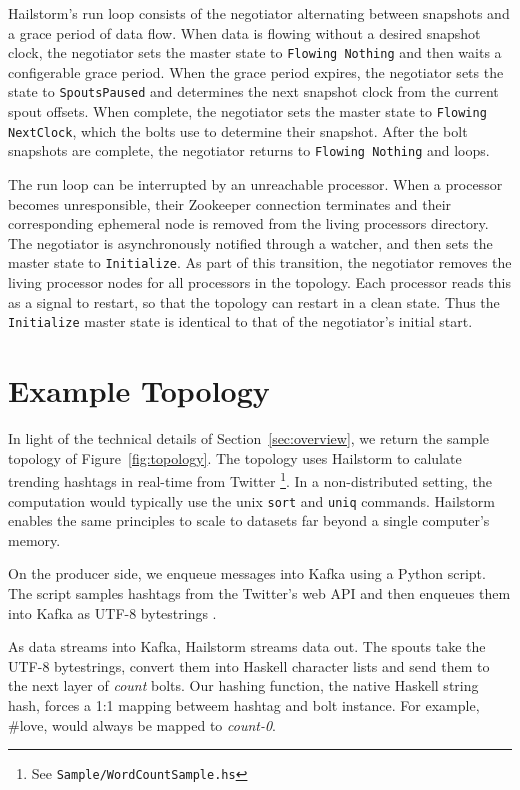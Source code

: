 \documentclass[10pt,nocopyrightspace]{sigplanconf}
\begin{document}
Hailstorm's run loop consists of the negotiator alternating between snapshots
and a grace period of data flow. When data is flowing without a desired snapshot
clock, the negotiator sets the master state to \lstinline{Flowing Nothing} and
then waits a configerable grace period. When the grace period expires, the
negotiator sets the state to \lstinline{SpoutsPaused} and determines the next
snapshot clock from the current spout offsets. When complete, the negotiator sets
the master state to \lstinline{Flowing NextClock}, which the bolts use to determine
their snapshot. After the bolt snapshots are complete, the negotiator returns to
\lstinline{Flowing Nothing} and loops.

The run loop can be interrupted by an unreachable processor. When a processor
becomes unresponsible, their Zookeeper connection terminates and their
corresponding ephemeral node is removed from the living processors directory.
The negotiator is asynchronously notified through a watcher, and then sets the
master state to \lstinline{Initialize}. As part of this transition, the negotiator
removes the living processor nodes for all processors in the topology. Each
processor reads this as a signal to restart, so that the topology can restart in
a clean state. Thus the \lstinline{Initialize} master state is identical to that of
the negotiator's initial start.

\section{Example Topology}
In light of the technical details of Section~\ref{sec:overview}, we return the
sample topology of Figure~\ref{fig:topology}. The topology uses 
Hailstorm to calulate trending hashtags in real-time from Twitter
\footnote{See \texttt{Sample/WordCountSample.hs}}. In a non-distributed setting,
the computation would typically use the unix \texttt{sort} and \texttt{uniq}
commands. Hailstorm enables the same principles to scale to datasets far beyond a
single computer's memory.

On the producer side, we enqueue messages into Kafka using a Python script. The script
samples hashtags from the Twitter's web API and then enqueues them into Kafka as 
UTF-8 bytestrings .

As data streams into Kafka, Hailstorm streams data out. The spouts
take the UTF-8 bytestrings, convert them into Haskell character lists
and send them to the next layer of \textit{count} bolts. Our hashing function, 
the native Haskell string hash, forces a 1:1 mapping betweem hashtag and bolt instance. 
For example, \#love, would always be mapped to \textit{count-0}.
\end{document}
